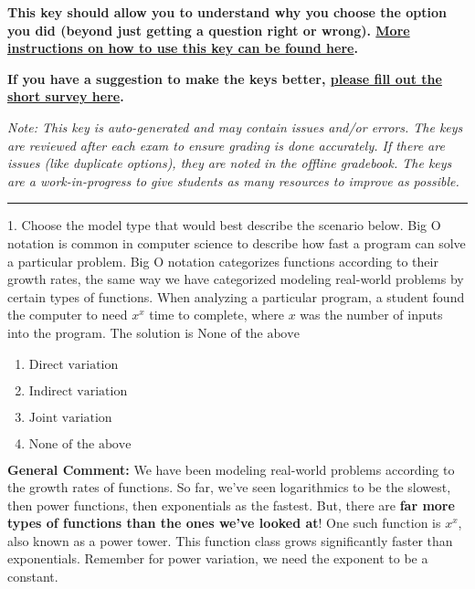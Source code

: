 \documentclass{extbook}[14pt]
\begin{document}
\textbf{This key should allow you to understand why you choose the option you did (beyond just getting a question right or wrong). \href{https://xronos.clas.ufl.edu/mac1105spring2020/courseDescriptionAndMisc/Exams/LearningFromResults}{More instructions on how to use this key can be found here}.}

\textbf{If you have a suggestion to make the keys better, \href{https://forms.gle/CZkbZmPbC9XALEE88}{please fill out the short survey here}.}

\textit{Note: This key is auto-generated and may contain issues and/or errors. The keys are reviewed after each exam to ensure grading is done accurately. If there are issues (like duplicate options), they are noted in the offline gradebook. The keys are a work-in-progress to give students as many resources to improve as possible.}

\rule{\textwidth}{0.4pt}

1. Choose the model type that would best describe the scenario below.
Big O notation is common in computer science to describe how fast a program can solve a particular problem. Big O notation categorizes functions according to their growth rates, the same way we have categorized modeling real-world problems by certain types of functions. When analyzing a particular program, a student found the computer to need $x^x$ time to complete, where $x$ was the number of inputs into the program. 
The solution is $ \text{None of the above} $ 

\begin{enumerate}[label=\Alph*.] 
\item $ \text{Direct variation} $ 

  
\item $ \text{Indirect variation} $ 

  
\item $ \text{Joint variation} $ 

  
\item $ \text{None of the above} $ 

  
\end{enumerate} 
 
\textbf{General Comment:} We have been modeling real-world problems according to the growth rates of functions. So far, we've seen logarithmics to be the slowest, then power functions, then exponentials as the fastest. But, there are \textbf{far more types of functions than the ones we've looked at}! One such function is $x^x$, also known as a power tower. This function class grows significantly faster than exponentials. Remember for power variation, we need the exponent to be a constant. 
\end{document}
